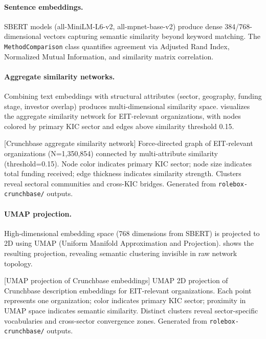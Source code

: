 \documentclass[../main.tex]{subfiles}
\begin{document}
\paragraph{Sentence embeddings.}
SBERT models (all-MiniLM-L6-v2, all-mpnet-base-v2) produce dense
384/768-dimensional vectors capturing semantic similarity beyond
keyword matching.
The \texttt{MethodComparison} class quantifies agreement via
Adjusted Rand Index, Normalized Mutual Information, and
similarity matrix correlation.

\paragraph{Aggregate similarity networks.}
Combining text embeddings with structural attributes
(sector, geography, funding stage, investor overlap) produces
multi-dimensional similarity space.
 visualizes the aggregate similarity network
for EIT-relevant organizations, with nodes colored by primary KIC sector
and edges above similarity threshold 0.15.

\begin{center}
[Crunchbase aggregate similarity network]{%
    Force-directed graph of EIT-relevant organizations (N=1,350,854)
    connected by multi-attribute similarity (threshold=0.15).
    Node color indicates primary KIC sector;
    node size indicates total funding received;
    edge thickness indicates similarity strength.
    Clusters reveal sectoral communities and cross-KIC bridges.
    Generated from \texttt{rolebox-crunchbase/} outputs.}
\label{fig:crunchbase-network}
\end{center}

\paragraph{UMAP projection.}
High-dimensional embedding space (768 dimensions from SBERT) is projected
to 2D using UMAP (Uniform Manifold Approximation and Projection).
 shows the resulting projection,
revealing semantic clustering invisible in raw network topology.

\begin{center}
[UMAP projection of Crunchbase embeddings]{%
    UMAP 2D projection of Crunchbase description embeddings
    for EIT-relevant organizations.
    Each point represents one organization;
    color indicates primary KIC sector;
    proximity in UMAP space indicates semantic similarity.
    Distinct clusters reveal sector-specific vocabularies
    and cross-sector convergence zones.
    Generated from \texttt{rolebox-crunchbase/} outputs.}
\label{fig:crunchbase-umap}
\end{center}
\end{document}
